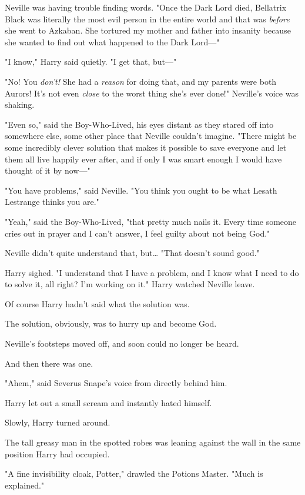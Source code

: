 Neville was having trouble finding words. "Once the Dark Lord died, Bellatrix 
Black was literally the most evil person in the entire world and that was 
\emph{before} she went to Azkaban. She tortured my mother and father into 
insanity because she wanted to find out what happened to the Dark Lord---"

"I know," Harry said quietly. "I get that, but---"

"No! You \emph{don't!} She had a \emph{reason} for doing that, and my parents 
were both Aurors! It's not even \emph{close} to the worst thing she's ever 
done!" Neville's voice was shaking.

"Even so," said the Boy-Who-Lived, his eyes distant as they stared off into 
somewhere else, some other place that Neville couldn't imagine. "There might be 
some incredibly clever solution that makes it possible to save everyone and let 
them all live happily ever after, and if only I was smart enough I would have 
thought of it by now---"

"You have problems," said Neville. "You think you ought to be what Lesath 
Lestrange thinks you are."

"Yeah," said the Boy-Who-Lived, "that pretty much nails it. Every time someone 
cries out in prayer and I can't answer, I feel guilty about not being God."

Neville didn't quite understand that, but{\ldots} "That doesn't sound good."

Harry sighed. "I understand that I have a problem, and I know what I need to do 
to solve it, all right? I'm working on it."
\sbreak
Harry watched Neville leave.

Of course Harry hadn't said what the solution was.

The solution, obviously, was to hurry up and become God.

Neville's footsteps moved off, and soon could no longer be heard.

And then there was one.

"Ahem," said Severus Snape's voice from directly behind him.

Harry let out a small scream and instantly hated himself.

Slowly, Harry turned around.

The tall greasy man in the spotted robes was leaning against the wall in the 
same position Harry had occupied.

"A fine invisibility cloak, Potter," drawled the Potions Master. "Much is 
explained."

